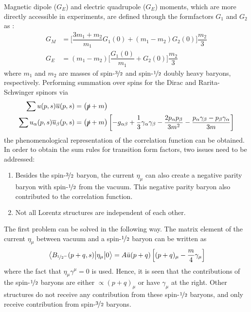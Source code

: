 Magnetic dipole ($G_E$) and electric quadrupole ($G_E$) moments, which are more directly accessible in experiments, are defined through the formfactors $G_1$ and $G_2$ as
\cite{JONESmatrixel,KORNERmatrixel}:
%
\begin{equation}
    \begin{aligned}
        G_M &= \Bigg[\dfrac{3m_1+m_2}{m_1}G_1(0) + \left(m_1-m_2\right)G_2(0)\Bigg]\dfrac{m_2}{3}\\
        G_E &= \left(m_1-m_2\right)\Bigg[\dfrac{G_1(0)}{m_1}+G_2(0)\Bigg]\dfrac{m_2}{3}
    \end{aligned}
    \label{GMandGE}
\end{equation}
%
where $m_1$ and $m_2$ are masses of spin-$\nicefrac{3}{2}$ and spin-$\nicefrac{1}{2}$ doubly heavy baryons, respectively.
%
Performing summation over spins for the Dirac and Rarita-Schwinger spinors via
\begin{equation}
    \begin{aligned}
        \sum u(p,s)\overline{u}(p,s) &= \left(\slashed{p}+m\right)\\
        \sum u_\alpha(p,s)\overline{u}_\beta(p,s) &= \left(\slashed{p}+m\right)\left[-g_{\alpha\beta}+\dfrac{1}{3}\gamma_\alpha\gamma_\beta-\dfrac{2p_\alpha p_\beta}{3m^2}-\dfrac{p_\alpha\gamma_\beta-p_\beta\gamma_\alpha}{3m}\right]
    \end{aligned}
    \label{spin_summations}
\end{equation}
the phenomenological representation of the correlation function can be obtained. In order to obtain the sum rules for transition form factors, two issues need to be addressed:
\begin{enumerate}
    \item Besides the spin-$\nicefrac{3}{2}$ baryon, the current $\eta_\mu$ can also create a negative parity baryon with spin-$\nicefrac{1}{2}$ from the vacuum. This negative parity baryon also contributed to the correlation function.
    \item Not all Lorentz structures are independent of each other.
\end{enumerate}
The first problem can be solved in the following way. The matrix element of the current $\eta_\mu$ between vacuum and a spin-$\nicefrac{1}{2}$ baryon can be written as
%
\begin{equation}
    \mel{B_{\nicefrac{1}{2}^-}(p+q,s)}{\eta_\mu}{0} = A \bar u(p+q) \left[(p+q)_\mu-\dfrac{m}{4}\gamma_\mu\right]
\end{equation}
where the fact that $\eta_\mu \gamma^\mu=0$ is used. Hence, it is seen that the contributions of the spin-$\nicefrac{1}{2}$ baryons are either $\propto (p+q)_\mu$ or have $\gamma_\mu$ at the right. Other structures do not receive any contribution from these spin-$\nicefrac{1}{2}$ baryons, and only receive contribution from spin-$\nicefrac{3}{2}$ baryons.
